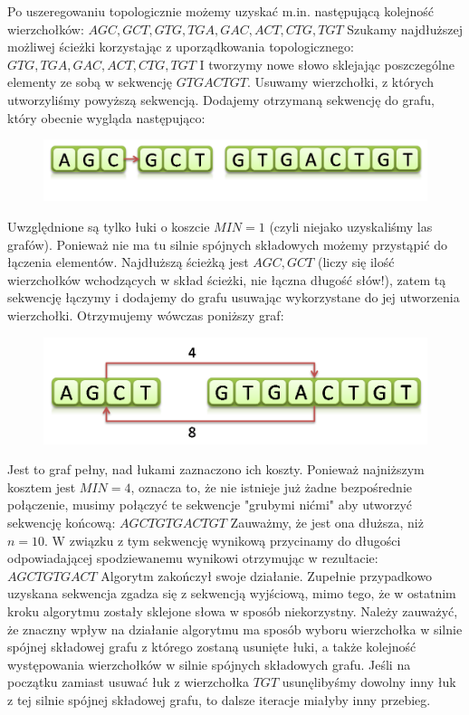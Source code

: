 \documentclass[a4paper,10pt]{article}
\begin{document}
Po uszeregowaniu topologicznie możemy uzyskać m.in. następującą kolejność wierzchołków:
$AGC, GCT, GTG, TGA, GAC, ACT, CTG, TGT$
Szukamy najdłuższej możliwej ścieżki korzystając z uporządkowania topologicznego:
$GTG, TGA, GAC, ACT, CTG, TGT$
I tworzymy nowe słowo sklejając poszczególne elementy ze sobą w sekwencję $GTGACTGT$.
Usuwamy wierzchołki, z których utworzyliśmy powyższą sekwencją. Dodajemy otrzymaną sekwencję do grafu, który obecnie wygląda następująco:

\begin{figure}[h]
  \footnotesize\centering
  \includegraphics[width=\textwidth,keepaspectratio]{Graph3.png}
\end{figure}

Uwzględnione są tylko łuki o koszcie $MIN=1$ (czyli niejako uzyskaliśmy las grafów). Ponieważ nie ma tu silnie spójnych składowych możemy przystąpić do łączenia elementów. Najdłuższą ścieżką jest $AGC, GCT$ (liczy się ilość wierzchołków wchodzących w skład ścieżki, nie łączna długość słów!), zatem tą sekwencję łączymy i dodajemy do grafu usuwając wykorzystane do jej utworzenia wierzchołki.
Otrzymujemy wówczas poniższy graf:

\begin{figure}[h]
  \footnotesize\centering
  \includegraphics[width=\textwidth,keepaspectratio]{Graph4.png}
\end{figure}
		 
Jest to graf pełny, nad łukami zaznaczono ich koszty. Ponieważ najniższym kosztem jest $MIN=4$, oznacza to, że nie istnieje już żadne bezpośrednie połączenie, musimy połączyć te sekwencje "grubymi nićmi" aby utworzyć sekwencję końcową:
$AGCTGTGACTGT$
Zauważmy, że jest ona dłuższa, niż $n=10$. W związku z tym sekwencję wynikową przycinamy do długości odpowiadającej spodziewanemu wynikowi otrzymując w rezultacie:
$AGCTGTGACT$
Algorytm zakończył swoje działanie. Zupełnie przypadkowo uzyskana sekwencja zgadza się z sekwencją wyjściową, mimo tego, że w ostatnim kroku algorytmu zostały sklejone słowa w sposób niekorzystny.
Należy zauważyć, że znaczny wpływ na działanie algorytmu ma sposób wyboru wierzchołka w silnie spójnej składowej grafu z którego zostaną usunięte łuki, a także kolejność występowania wierzchołków w silnie spójnych składowych grafu. Jeśli na początku zamiast usuwać łuk z wierzchołka $TGT$ usunęlibyśmy dowolny inny łuk z tej silnie spójnej składowej grafu, to dalsze iteracje miałyby inny przebieg.
\end{document}
